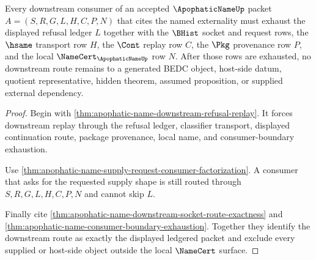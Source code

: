 \begin{theorem}
\label{thm:apophaticname-downstream-refusal-ledger-exhaustion}
Every downstream consumer of an accepted $\ApophaticNameUp$ packet $A=(S,R,G,L,H,C,P,N)$ that cites the named externality must exhaust the displayed refusal ledger $L$ together with the $\BHist$ socket and request rows, the $\hsame$ transport row $H$, the $\Cont$ replay row $C$, the $\Pkg$ provenance row $P$, and the local $\NameCert_{\ApophaticNameUp}$ row $N$. After those rows are exhausted, no downstream route remains to a generated BEDC object, host-side datum, quotient representative, hidden theorem, assumed proposition, or supplied external dependency.
\end{theorem}
\begin{proof}
Begin with \autoref{thm:apophatic-name-downstream-refusal-replay}. It forces downstream replay through the refusal ledger, classifier transport, displayed continuation route, package provenance, local name, and consumer-boundary exhaustion.

Use \autoref{thm:apophatic-name-supply-request-consumer-factorization}. A consumer that asks for the requested supply shape is still routed through $S,R,G,L,H,C,P,N$ and cannot skip $L$.

Finally cite \autoref{thm:apophatic-name-downstream-socket-route-exactness} and \autoref{thm:apophatic-name-consumer-boundary-exhaustion}. Together they identify the downstream route as exactly the displayed ledgered packet and exclude every supplied or host-side object outside the local $\NameCert$ surface.
\end{proof}

